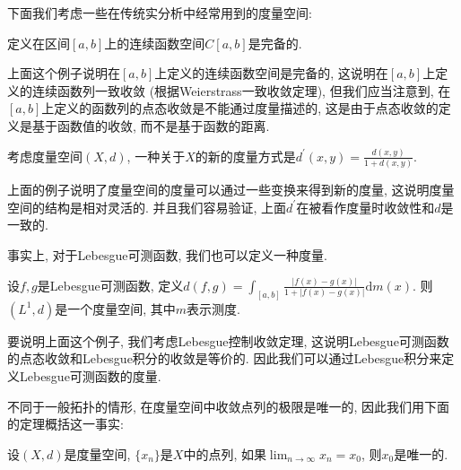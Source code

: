 \documentclass[theorem=false,mathfont=none,openany,sub3section]{easybook}
\begin{document}
下面我们考虑一些在传统实分析中经常用到的度量空间:\par

\begin{example}
  定义在区间$[a,b]$上的连续函数空间$C[a,b]$是完备的.\par
\end{example}

\begin{remark}
  上面这个例子说明在$[a,b]$上定义的连续函数空间是完备的, 这说明在$[a,b]$上定义的连续函数列一致收敛 (根据Weierstrass一致收敛定理), 但我们应当注意到, 在$[a,b]$上定义的函数列的点态收敛是不能通过度量描述的, 这是由于点态收敛的定义是基于函数值的收敛, 而不是基于函数的距离.\par
\end{remark}

\begin{example}
  考虑度量空间$(X,d)$, 一种关于$X$的新的度量方式是$d^{\prime}(x,y)=\frac{d(x,y)}{1+d(x,y)}$.\par
\end{example}

\begin{remark}
  上面的例子说明了度量空间的度量可以通过一些变换来得到新的度量, 这说明度量空间的结构是相对灵活的. 并且我们容易验证, 上面$d^{\prime}$在被看作度量时收敛性和$d$是一致的.\par
\end{remark}

事实上, 对于Lebesgue可测函数, 我们也可以定义一种度量.\par

\begin{example}
  设$f,g$是Lebesgue可测函数, 定义$d(f,g) = \int_{[a,b]}^{} \frac{|f(x) - g(x)|}{1+|f(x) - g(x)|} \mathrm{d}m(x)$. 则$(L^1, d)$是一个度量空间, 其中$m$表示测度.\par
\end{example}

\begin{remark}
  要说明上面这个例子, 我们考虑Lebesgue控制收敛定理, 这说明Lebesgue可测函数的点态收敛和Lebesgue积分的收敛是等价的. 因此我们可以通过Lebesgue积分来定义Lebesgue可测函数的度量.\par
\end{remark}

不同于一般拓扑的情形, 在度量空间中收敛点列的极限是唯一的, 因此我们用下面的定理概括这一事实:\par

\begin{theorem}
  设$(X,d)$是度量空间, $\{x_n\}$是$X$中的点列, 如果$\lim_{n \to \infty} x_n = x_0$, 则$x_0$是唯一的.\par
\end{theorem}
\end{document}
